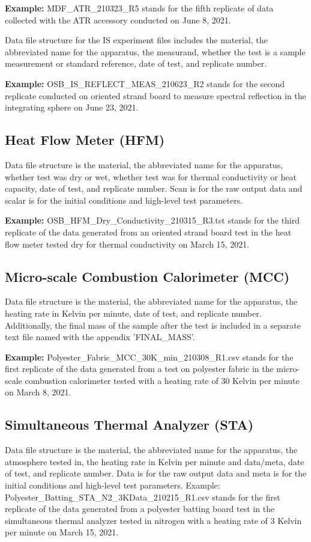 \documentclass[12pt,oneside]{book}
\begin{document}
{\bf Example:} MDF\_ATR\_210323\_R5 stands for the fifth replicate of data collected with the ATR accessory conducted on June 8, 2021.

Data file structure for the IS experiment files includes the material, the abbreviated name for the apparatus, the measurand, whether the test is a sample measurement or standard reference, date of test, and replicate number.

{\bf Example:} OSB\_IS\_REFLECT\_MEAS\_210623\_R2 stands for the second replicate conducted on oriented strand board to measure spectral reflection in the integrating sphere on June 23, 2021.

\subsection{Heat Flow Meter (HFM)}
Data file structure is the material, the abbreviated name for the apparatus, whether test was dry or wet, whether test was for thermal conductivity or heat capacity, date of test, and replicate number. Scan is for the raw output data and scalar is for the initial conditions and high-level test parameters.

{\bf Example:} OSB\_HFM\_Dry\_Conductivity\_210315\_R3.tst stands for the third replicate of the data generated from an oriented strand board test in the heat flow meter tested dry for thermal conductivity on March 15, 2021.

\subsection{Micro-scale Combustion Calorimeter (MCC)}
Data file structure is the material, the abbreviated name for the apparatus, the heating rate in Kelvin per minute, date of test, and replicate number. Additionally, the final mass of the sample after the test is included in a separate text file named with the appendix 'FINAL\_MASS'.

{\bf Example:} Polyester\_Fabric\_MCC\_30K\_min\_210308\_R1.csv stands for the first replicate of the data generated from a test on polyester fabric in the micro-scale combustion calorimeter tested with a heating rate of 30 Kelvin per minute on March 8, 2021.

\subsection{Simultaneous Thermal Analyzer (STA)}
Data file structure is the material, the abbreviated name for the apparatus, the atmosphere tested in, the heating rate in Kelvin per minute and data/meta, date of test, and replicate number. Data is for the raw output data and meta is for the initial conditions and high-level test parameters.
Example: Polyester\_Batting\_STA\_N2\_3KData\_210215\_R1.csv stands for the first replicate of the data generated from a polyester batting board test in the simultaneous thermal analyzer tested in nitrogen with a heating rate of 3 Kelvin per minute on March 15, 2021.
\end{document}
